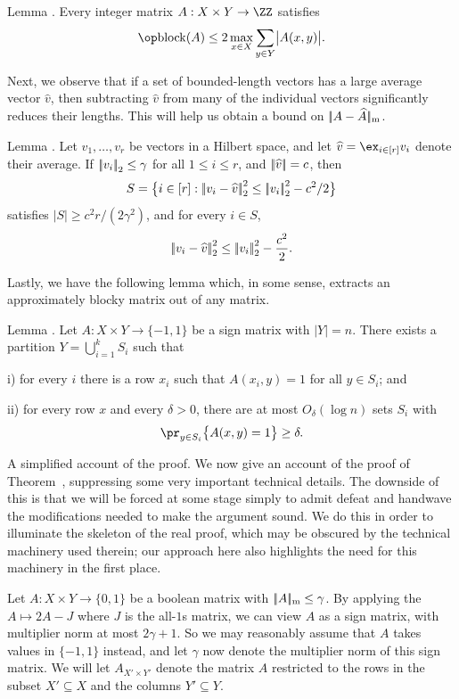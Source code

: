 \edef\lemblockbound{\the\sectcount.\the\thmcount}
\proclaim Lemma \advthm. Every integer matrix $A:X\times Y\to \ZZ$ satisfies
$$\block(A) \le 2\max_{x\in X} \sum_{y\in Y} \bigl| A(x,y)\bigr|.$$

Next, we observe that if a set of bounded-length vectors has a large average vector $\hat v$,
then subtracting $\hat v$ from many of the individual vectors significantly reduces their
lengths. This will help us obtain a bound on $|\!|A-\widehat A|\!|_{\rm m}$.

\edef\lemaveragevector{\the\sectcount.\the\thmcount}
\proclaim Lemma \advthm. Let $v_1,\ldots,v_r$ be vectors in a Hilbert space,
and let $\hat v = \ex_{i\in [r]} v_i$ denote their average. If $\left|\!\left|v_i\right|\!\right|_2\le \gamma$ for all
$1\le i\le r$, and $\left|\!\left|\widehat v\right|\!\right| = c$, then
$$S = \bigl\{ i\in [r] : \left|\!\left|v_i - \widehat v\right|\!\right|_2^2 \le \left|\!\left|v_i\right|\!\right|_2^2 - c^2/2\bigr\}$$
satisfies $|S| \ge c^2 r/(2\gamma^2)$, and for every $i\in S$,
$$\left|\!\left|v_i - \widehat v\right|\!\right|_2^2 \le \left|\!\left|v_i\right|\!\right|_2^2 - {c^2\over 2}.$$

Lastly, we have the following lemma which, in some sense, extracts an approximately blocky matrix
out of any matrix.

\edef\lempartition{\the\sectcount.\the\thmcount}
\proclaim Lemma \advthm. Let $A:X\times Y\to \{-1,1\}$ be a sign matrix with $|Y|=n$. There exists
a partition $Y = \bigcup_{i=1}^k S_i$ such that
\medskip
\item{i)} for every $i$ there is a row $x_i$ such that $A(x_i,y) = 1$ for all $y\in S_i$; and
\smallskip
\item{ii)} for every row $x$ and every $\delta > 0$, there are at most $O_\delta(\log n)$ sets $S_i$
with
$$\pr_{y\in S_i} \bigl\{ A(x,y) = 1\bigr\} \ge \delta.$$

\medskip\boldlabel A simplified account of the proof.
We now give an account of the proof of Theorem~{\thmGH}, suppressing some very important
technical details. The downside of this is that we will be forced at some stage simply to admit defeat
and handwave the modifications needed to make the argument sound.
We do this in order to illuminate the skeleton of the real proof, which may be obscured by the
technical machinery used therein; our approach here also highlights the need for this
machinery in the first place.

Let $A:X\times Y\to \{0,1\}$ be a boolean matrix with
$|\!|A|\!|_{\rm m} \le \gamma$. By applying the
$A \mapsto 2A - J$ where $J$ is the all-$1$s matrix, we can view $A$ as a sign matrix, with
multiplier norm at most $2\gamma + 1$. So we may reasonably assume that
$A$ takes values in $\{-1,1\}$ instead, and let $\gamma$
now denote the multiplier norm of this sign matrix.
We will let $A_{X'\times Y'}$
denote the matrix $A$ restricted to the rows in the subset $X'\subseteq X$ and the columns
$Y'\subseteq Y$.

